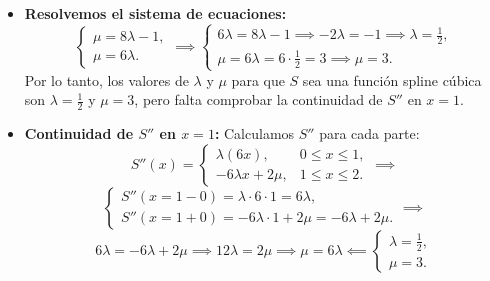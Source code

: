 {\begin{itemize}
\[            \implies
        \]
        \[
            \begin{cases}
                S'(x=1-0) = \lambda \cdot (3 \cdot 1^2 + 1) = 4\lambda,\\
                S'(x=1+0) = -3\lambda \cdot 1^2 + 2\mu \cdot 1 - 5\lambda = -8\lambda + 2\mu.
            \end{cases}
            \implies
        \]
        \[
            4\lambda = -8\lambda + 2\mu \implies 12\lambda = 2\mu \implies \mu = 6\lambda.
        \]
        \item \textbf{Resolvemos el sistema de ecuaciones:}
        \[
            \begin{cases}
                \mu = 8\lambda - 1,\\
                \mu = 6\lambda.
            \end{cases}
            \implies 
            \begin{cases}
                6\lambda = 8\lambda - 1 \implies -2\lambda = -1 \implies \boxed{\lambda = \frac{1}{2}},\\
                \mu = 6\lambda = 6 \cdot \frac{1}{2} = 3 \implies \boxed{\mu = 3}.
            \end{cases}
        \]
        Por lo tanto, los valores de $\lambda$ y $\mu$ para que $S$ sea una función spline cúbica son $\lambda = \frac{1}{2}$ y $\mu = 3$, pero falta comprobar la continuidad de $S''$ en $x=1$.
        \item \textbf{Continuidad de $S''$ en $x=1$:}
        Calculamos $S''$ para cada parte:
        \[
            S''(x) =
            \begin{cases}
                \lambda (6x), & 0 \le x \le 1,\\
                -6\lambda x + 2\mu, & 1 \le x \le 2.
            \end{cases}
            \implies
        \]
        \[
            \begin{cases}
                S''(x=1-0) = \lambda \cdot 6 \cdot 1 = 6\lambda,\\
                S''(x=1+0) = -6\lambda \cdot 1 + 2\mu = -6\lambda + 2\mu.
            \end{cases}
            \implies
        \]
        \[
            6\lambda = -6\lambda + 2\mu \implies 
            12\lambda = 2\mu \implies 
            \mu = 6\lambda \impliedby 
            \begin{cases}
                \lambda = \frac{1}{2},\\
                \mu = 3.

\end{cases}\]
\end{itemize}}

